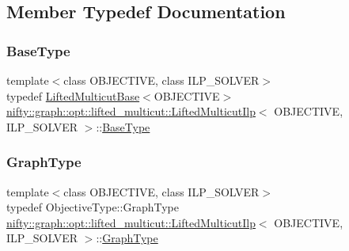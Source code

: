 \subsection{Member Typedef Documentation}
\mbox{\label{classnifty_1_1graph_1_1opt_1_1lifted__multicut_1_1LiftedMulticutIlp_a29168294e72e012961d3ff70fa1f517c}} 
\subsubsection{\texorpdfstring{Base\+Type}{BaseType}}
{\footnotesize\ttfamily template$<$class O\+B\+J\+E\+C\+T\+I\+VE, class I\+L\+P\+\_\+\+S\+O\+L\+V\+ER$>$ \\
typedef \hyperlink{classnifty_1_1graph_1_1opt_1_1lifted__multicut_1_1LiftedMulticutBase}{Lifted\+Multicut\+Base}$<$O\+B\+J\+E\+C\+T\+I\+VE$>$ \hyperlink{classnifty_1_1graph_1_1opt_1_1lifted__multicut_1_1LiftedMulticutIlp}{nifty\+::graph\+::opt\+::lifted\+\_\+multicut\+::\+Lifted\+Multicut\+Ilp}$<$ O\+B\+J\+E\+C\+T\+I\+VE, I\+L\+P\+\_\+\+S\+O\+L\+V\+ER $>$\+::\hyperlink{classnifty_1_1graph_1_1opt_1_1lifted__multicut_1_1LiftedMulticutIlp_a29168294e72e012961d3ff70fa1f517c}{Base\+Type}}

\mbox{\label{classnifty_1_1graph_1_1opt_1_1lifted__multicut_1_1LiftedMulticutIlp_a0cfe042d75a75472055a37392518facf}} 
\subsubsection{\texorpdfstring{Graph\+Type}{GraphType}}
{\footnotesize\ttfamily template$<$class O\+B\+J\+E\+C\+T\+I\+VE, class I\+L\+P\+\_\+\+S\+O\+L\+V\+ER$>$ \\
typedef Objective\+Type\+::\+Graph\+Type \hyperlink{classnifty_1_1graph_1_1opt_1_1lifted__multicut_1_1LiftedMulticutIlp}{nifty\+::graph\+::opt\+::lifted\+\_\+multicut\+::\+Lifted\+Multicut\+Ilp}$<$ O\+B\+J\+E\+C\+T\+I\+VE, I\+L\+P\+\_\+\+S\+O\+L\+V\+ER $>$\+::\hyperlink{classnifty_1_1graph_1_1opt_1_1lifted__multicut_1_1LiftedMulticutIlp_a0cfe042d75a75472055a37392518facf}{Graph\+Type}}

